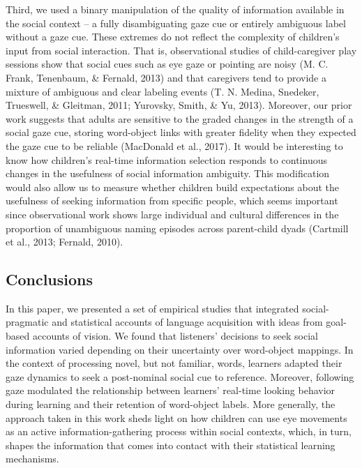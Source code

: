\documentclass[man,floatsintext]{apa6}
\begin{document}
Third, we used a binary manipulation of the quality of information
available in the social context -- a fully disambiguating gaze cue or
entirely ambiguous label without a gaze cue. These extremes do not
reflect the complexity of children's input from social interaction. That
is, observational studies of child-caregiver play sessions show that
social cues such as eye gaze or pointing are noisy (M. C. Frank,
Tenenbaum, \& Fernald, 2013) and that caregivers tend to provide a
mixture of ambiguous and clear labeling events (T. N. Medina, Snedeker,
Trueswell, \& Gleitman, 2011; Yurovsky, Smith, \& Yu, 2013). Moreover,
our prior work suggests that adults are sensitive to the graded changes
in the strength of a social gaze cue, storing word-object links with
greater fidelity when they expected the gaze cue to be reliable
(MacDonald et al., 2017). It would be interesting to know how children's
real-time information selection responds to continuous changes in the
usefulness of social information ambiguity. This modification would also
allow us to measure whether children build expectations about the
usefulness of seeking information from specific people, which seems
important since observational work shows large individual and cultural
differences in the proportion of unambiguous naming episodes across
parent-child dyads (Cartmill et al., 2013; Fernald, 2010).

\subsection{Conclusions}\label{conclusions}

In this paper, we presented a set of empirical studies that integrated
social-pragmatic and statistical accounts of language acquisition with
ideas from goal-based accounts of vision. We found that listeners'
decisions to seek social information varied depending on their
uncertainty over word-object mappings. In the context of processing
novel, but not familiar, words, learners adapted their gaze dynamics to
seek a post-nominal social cue to reference. Moreover, following gaze
modulated the relationship between learners' real-time looking behavior
during learning and their retention of word-object labels. More
generally, the approach taken in this work sheds light on how children
can use eye movements as an active information-gathering process within
social contexts, which, in turn, shapes the information that comes into
contact with their statistical learning mechanisms.

\newpage
\end{document}
